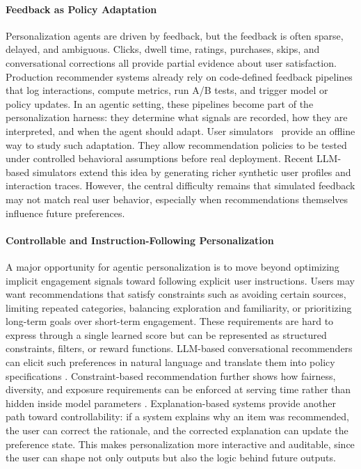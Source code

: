 \paragraph{Feedback as Policy Adaptation}
Personalization agents are driven by feedback, but the feedback is often sparse, delayed, and ambiguous. Clicks, dwell time, ratings, purchases, skips, and conversational corrections all provide partial evidence about user satisfaction. Production recommender systems already rely on code-defined feedback pipelines that log interactions, compute metrics, run A/B tests, and trigger model or policy updates. In an agentic setting, these pipelines become part of the personalization harness: they determine what signals are recorded, how they are interpreted, and when the agent should adapt.
User simulators~\citep{zhang2025llm,wang2025user,liu2025recoworld} provide an offline way to study such adaptation. They allow recommendation policies to be tested under controlled behavioral assumptions before real deployment. Recent LLM-based simulators extend this idea by generating richer synthetic user profiles and interaction traces. However, the central difficulty remains that simulated feedback may not match real user behavior, especially when recommendations themselves influence future preferences.

\paragraph{Controllable and Instruction-Following Personalization}
A major opportunity for agentic personalization is to move beyond optimizing implicit engagement signals toward following explicit user instructions. Users may want recommendations that satisfy constraints such as avoiding certain sources, limiting repeated categories, balancing exploration and familiarity, or prioritizing long-term goals over short-term engagement. These requirements are hard to express through a single learned score but can be represented as structured constraints, filters, or reward functions.
LLM-based conversational recommenders can elicit such preferences in natural language and translate them into policy specifications \citep{hou2024large}. Constraint-based recommendation further shows how fairness, diversity, and exposure requirements can be enforced at serving time rather than hidden inside model parameters \citep{lei2020conversational}. Explanation-based systems provide another path toward controllability: if a system explains why an item was recommended, the user can correct the rationale, and the corrected explanation can update the preference state. This makes personalization more interactive and auditable, since the user can shape not only outputs but also the logic behind future outputs.

